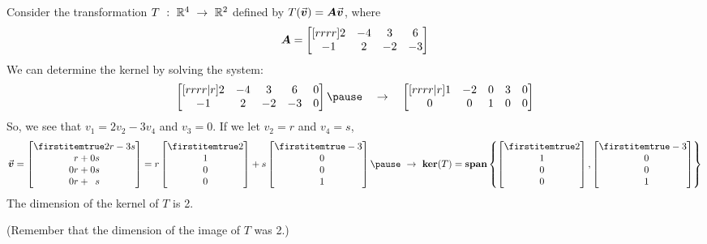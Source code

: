 \documentclass{beamer}
\begin{document}
\begin{frame}
\begin{example}
Consider the transformation $T\ :\ \mathbb{R}^4\ \rightarrow\ \mathbb{R}^2$ defined by $T({\vec{\boldsymbol{v}}})=\boldsymbol{A}{\vec{\boldsymbol{v}}}$, where
\begin{equation*}
\boldsymbol{A}=\begin{bmatrix}[rrrr]
 2 & -4 &  3 & 6 \\
-1 &  2 & -2 & -3 \\
\end{bmatrix}
\end{equation*}\pause
We can determine the kernel by solving the system:
\begin{equation*}
\begin{bmatrix}[rrrr|r]
2 & -4 & 3 & 6  & 0\\
-1 & 2 & -2 & -3 & 0 \\
\end{bmatrix}\pause
\quad\rightarrow\quad
\begin{bmatrix}[rrrr|r]
1 & -2 & 0 & 3 & 0\\
0 & 0 & 1 & 0 & 0\\
\end{bmatrix}
\end{equation*}\pause
So, we see that $v_1=2v_2-3v_4$ and $v_3=0$. If we let $v_2=r$ and $v_4=s$,
\begin{equation*}
\vect{v}
=\bvector{2r-3s,\phantom{0}r+0s,0r+0s,0r+\phantom{0}s}
=r\bvector{2,1,0,0}+s\bvector{-3,\+0,\+0,\+1}\pause
\ \rightarrow\ 
\ker(T)=\spn\left\{\bvector{2,1,0,0},\bvector{-3,\+0,\+0,\+1}\right\}
\end{equation*}
The dimension of the kernel of $T$ is 2.\pause

(Remember that the dimension of the image of $T$ was 2.)
\end{example}
\end{frame}
\end{document}
